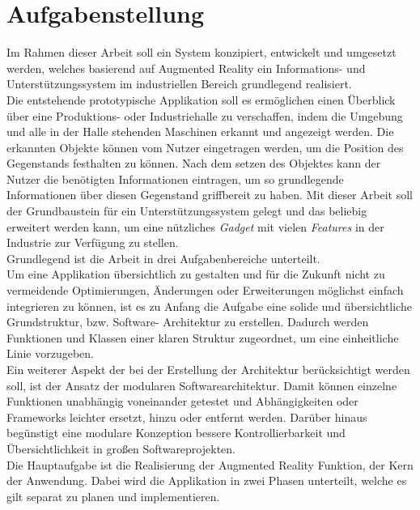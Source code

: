 \section{Aufgabenstellung}
\label{chap:Aufgabenstellung}          %
Im Rahmen dieser Arbeit soll ein System konzipiert, entwickelt und umgesetzt werden, welches basierend auf Augmented Reality ein 
Informations- und Unterstützungssystem im industriellen Bereich grundlegend realisiert. 
\\Die entstehende prototypische Applikation soll es ermöglichen einen Überblick über eine Produktions- oder Industriehalle zu 
verschaffen, indem die Umgebung und alle in der Halle stehenden Maschinen erkannt und angezeigt werden. Die erkannten Objekte können 
vom Nutzer eingetragen werden, um die Position des Gegenstands festhalten zu können. Nach dem setzen des Objektes kann der Nutzer 
die benötigten Informationen eintragen, um so grundlegende Informationen über diesen Gegenstand griffbereit zu haben. Mit dieser Arbeit 
soll der Grundbaustein für ein Unterstützungssystem gelegt und das beliebig erweitert werden kann, um eine nützliches \textit{Gadget} 
mit vielen \textit{Features} in der Industrie zur Verfügung zu stellen.
\\ 
\linebreak
Grundlegend ist die Arbeit in drei Aufgabenbereiche unterteilt.
\\
\linebreak
Um eine Applikation übersichtlich zu gestalten und für die Zukunft nicht zu vermeidende Optimierungen, Änderungen oder Erweiterungen 
möglichst einfach integrieren zu können, ist es zu Anfang die Aufgabe eine solide und übersichtliche Grundstruktur, bzw. Software-
Architektur zu erstellen. Dadurch werden Funktionen und Klassen einer klaren Struktur zugeordnet, um eine einheitliche Linie vorzugeben. 
\\
Ein weiterer Aspekt der bei der Erstellung der Architektur berücksichtigt werden soll, ist der Ansatz der modularen 
Softwarearchitektur. Damit können einzelne Funktionen unabhängig voneinander getestet und Abhängigkeiten oder Frameworks leichter 
ersetzt, hinzu oder entfernt werden. Darüber hinaus begünstigt eine modulare Konzeption bessere Kontrollierbarkeit und Übersichtlichkeit 
in großen Softwareprojekten.
\\
\linebreak
Die Hauptaufgabe ist die Realisierung der Augmented Reality Funktion, der Kern der Anwendung. Dabei wird die Applikation in zwei 
Phasen unterteilt, welche es gilt separat zu planen und implementieren.
